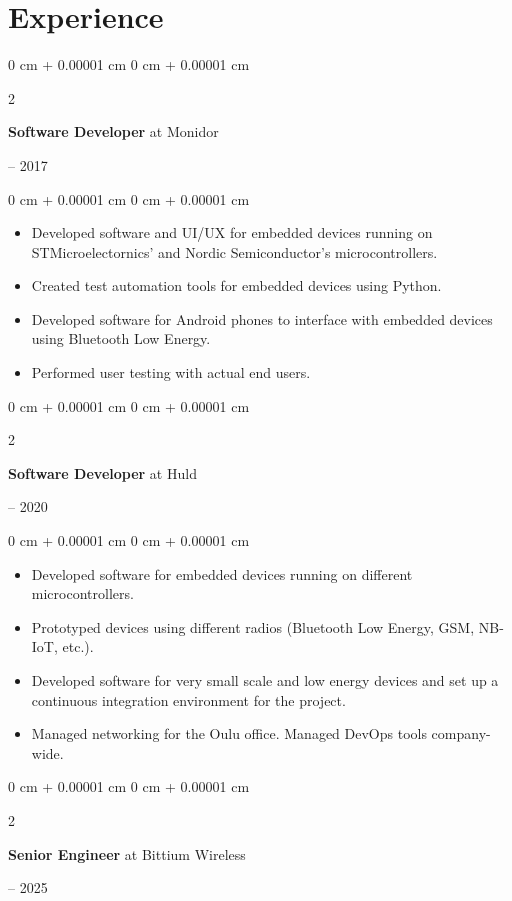 \documentclass{article}
\newenvironment{highlights}{
    \begin{itemize}[
        topsep=0.10 cm,
        parsep=0.10 cm,
        partopsep=0pt,
        itemsep=0pt,
        leftmargin=0 cm + 10pt
    ]
}{
    \end{itemize}
}
\newenvironment{onecolentry}{
    \begin{adjustwidth}{
        0 cm + 0.00001 cm
    }{
        0 cm + 0.00001 cm
    }
}{
    \end{adjustwidth}
}
\newenvironment{twocolentry}[2][]{
    \onecolentry
    \def\secondColumn{#2}
    \setcolumnwidth{\fill, 4.5 cm}
    \begin{paracol}{2}
}{
    \switchcolumn \raggedleft \secondColumn
    \end{paracol}
    \endonecolentry
}
\begin{document}
  \section{Experience}
    \begin{twocolentry}{2016 -- 2017}
      \textbf{Software Developer} at Monidor
    \end{twocolentry}
    \vspace{0.1 cm}
    \begin{onecolentry}
      \begin{highlights}
        \item Developed software and UI/UX for embedded devices running on STMicroelectornics' and Nordic Semiconductor's microcontrollers.
        \item Created test automation tools for embedded devices using Python.
        \item Developed software for Android phones to interface with embedded devices using Bluetooth Low Energy.
        \item Performed user testing with actual end users.
      \end{highlights}
    \end{onecolentry}
    \vspace{0.3 cm}
    \begin{twocolentry}{2017 -- 2020}
      \textbf{Software Developer} at Huld
    \end{twocolentry}
    \vspace{0.1 cm}
    \begin{onecolentry}
      \begin{highlights}
        \item Developed software for embedded devices running on different microcontrollers.
        \item Prototyped devices using different radios (Bluetooth Low Energy, GSM, NB-IoT, etc.).
        \item Developed software for very small scale and low energy devices and set up a continuous integration environment for the project.
        \item Managed networking for the Oulu office. Managed DevOps tools company-wide.
      \end{highlights}
    \end{onecolentry}
    \vspace{0.3 cm}
    \begin{twocolentry}{2020 -- 2025}
      \textbf{Senior Engineer} at Bittium Wireless
    \end{twocolentry}
\end{document}
